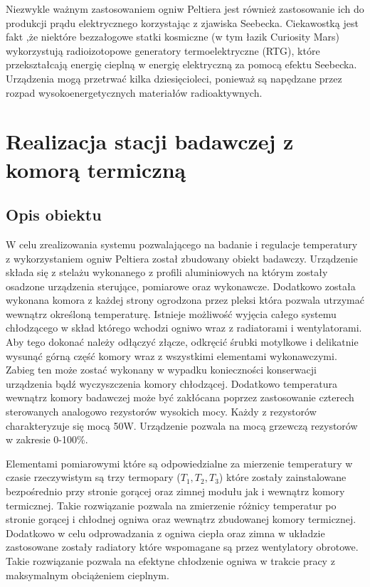 \documentclass[oneside]{mgr}
\begin{document}
Niezwykle ważnym zastosowaniem ogniw Peltiera jest również zastosowanie ich do produkcji prądu elektrycznego korzystając z zjawiska Seebecka. Ciekawostką jest fakt ,że niektóre bezzałogowe statki kosmiczne (w tym łazik Curiosity Mars) wykorzystują radioizotopowe generatory termoelektryczne (RTG), które przekształcają energię cieplną w energię elektryczną za pomocą efektu Seebecka. Urządzenia mogą przetrwać kilka dziesięcioleci, ponieważ są napędzane przez rozpad wysokoenergetycznych materiałów radioaktywnych.

\chapter{Realizacja stacji badawczej z komorą termiczną}
\section{Opis obiektu}

W celu zrealizowania systemu pozwalającego na badanie i regulacje temperatury z wykorzystaniem ogniw Peltiera został zbudowany obiekt badawczy. Urządzenie składa się z stelażu wykonanego z profili aluminiowych na którym zostały osadzone urządzenia sterujące, pomiarowe oraz wykonawcze. Dodatkowo została wykonana komora z każdej strony ogrodzona przez pleksi która pozwala utrzymać wewnątrz określoną temperaturę. Istnieje możliwość wyjęcia całego systemu chłodzącego w skład którego wchodzi ogniwo wraz z radiatorami i wentylatorami. Aby tego dokonać należy odłączyć złącze, odkręcić śrubki motylkowe i delikatnie wysunąć górną część komory wraz z wszystkimi elementami wykonawczymi. Zabieg ten może zostać wykonany w wypadku konieczności konserwacji urządzenia bądź wyczyszczenia komory chłodzącej. Dodatkowo temperatura wewnątrz komory badawczej może być zakłócana poprzez zastosowanie czterech sterowanych analogowo rezystorów wysokich mocy. Każdy z rezystorów charakteryzuje się mocą 50W. Urządzenie pozwala na mocą grzewczą rezystorów w zakresie 0-100\%.

Elementami pomiarowymi które są odpowiedzialne za mierzenie temperatury  w czasie rzeczywistym są trzy termopary ($T_1, T_2, T_3$) które zostały zainstalowane bezpośrednio przy stronie gorącej oraz zimnej modułu jak i wewnątrz komory termicznej. Takie rozwiązanie pozwala na zmierzenie różnicy temperatur po stronie gorącej i chłodnej ogniwa oraz wewnątrz zbudowanej komory termicznej. Dodatkowo w celu odprowadzania z ogniwa ciepła oraz zimna w układzie zastosowane zostały radiatory które wspomagane są przez wentylatory obrotowe. Takie rozwiązanie pozwala na efektyne chłodzenie ogniwa w trakcie pracy z maksymalnym obciążeniem cieplnym.
\end{document}
